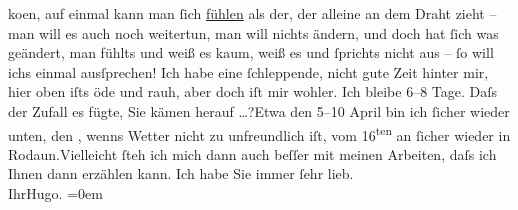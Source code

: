 \begin{ledgroupsized}[t]{13cm}
                  ko{\geminationm}en, auf einmal kann man ſich \uline{fühlen} als der, der alleine an dem Draht zieht – man will es
               auch noch weitertun, man will nichts ändern, und doch hat ſich was geändert, man
               fühlts und weiß es kaum, weiß es und ſprichts nicht aus – {\pb}ſo will ichs einmal
               ausſprechen!\pend
           \pstart
           Ich habe eine ſchleppende, nicht gute Zeit hinter mir, hier oben iſts öde und rauh,
               aber doch iſt mir wohler.\pend
           \pstart
           Ich bleibe \label{K_L02167_2v}\label{K_L02167_2h} 6–8 Tage. Daſs der Zufall es fügte, Sie kämen
               herauf {\dots}?\hspace*{1.5em}Etwa den
                  5–10 April bin ich ſicher wieder unten, den \label{K_L02167_3v}\label{K_L02167_3h}, wenns Wetter nicht zu unfreundlich iſt, vom
                     16\textsuperscript{ten} an ſicher wieder in Rodaun.\hspace*{1.5em}Vielleicht ſteh ich mich dann auch beſſer  mit meinen Arbeiten, daſs ich Ihnen dann erzählen
               kann.\pend
           \pstart
           Ich habe Sie immer ſehr lieb.{\\[\baselineskip]}Ihr\spacefill\mbox{Hugo.}\pend
           \leftskip=0em{}\endnumbering{}\end{ledgroupsized}  \newcommand{\dateiname}{L02167}\newcommand{\titel}{Hugo von Hofmannsthal an Arthur Schnitzler, 27. 3. [1914]}\newcommand{\editorInnen}{Martin Anton Müller und Gerd-Hermann Susen}
      